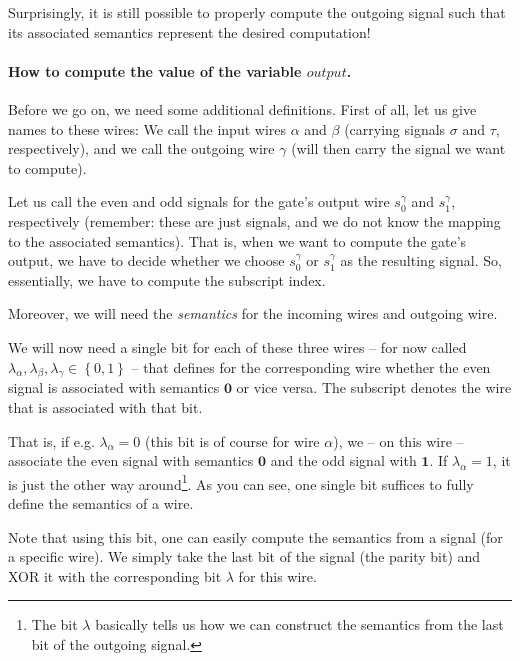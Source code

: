 Surprisingly, it is still possible to properly compute the outgoing signal such that its associated semantics represent the desired computation! 

\paragraph{How to compute the value of the variable $output$.}
\label{sec:how-compute-value-variable-output}

Before we go on, we need some additional definitions. First of all, let us give names to these wires: We call the input wires $\alpha$ and $\beta$ (carrying signals $\sigma$ and $\tau$, respectively), and we call the outgoing wire $\gamma$ (will then carry the signal we want to compute).

Let us call the even and odd signals for the gate's output wire $s^\gamma_0$ and $s^\gamma_1$, respectively (remember: these are just signals, and we do not know the mapping to the associated semantics). That is, when we want to compute the gate's output, we have to decide whether we choose $s^\gamma_0$ or $s^\gamma_1$ as the resulting signal. So, essentially, we have to compute the subscript index.

\newcommand{\semoutput}{\lambda}

Moreover, we will need the \emph{semantics} for the incoming wires and outgoing wire. 

We will now need a single bit for each of these three wires -- for now called $\semoutput_\alpha,\semoutput_\beta,\semoutput_\gamma\in\left\{ 0,1 \right\}$ -- that defines for the corresponding wire whether the even signal is associated with semantics $\mathbf{0}$ or vice versa. The subscript denotes the wire that is associated with that bit.

That is, if e.g. $\semoutput_\alpha=0$ (this bit is of course for wire $\alpha$), we -- on this wire -- associate the even signal with semantics $\mathbf{0}$ and the odd signal with $\mathbf{1}$. If $\semoutput_\alpha=1$, it is just the other way around\footnote{The bit $\semoutput$ basically tells us how we can construct the semantics from the last bit of the outgoing signal.}. As you can see, one single bit suffices to fully define the semantics of a wire.

Note that using this bit, one can easily compute the semantics from a signal (for a specific wire). We simply take the last bit of the signal (the parity bit) and XOR it with the corresponding bit $\semoutput$ for this wire.

